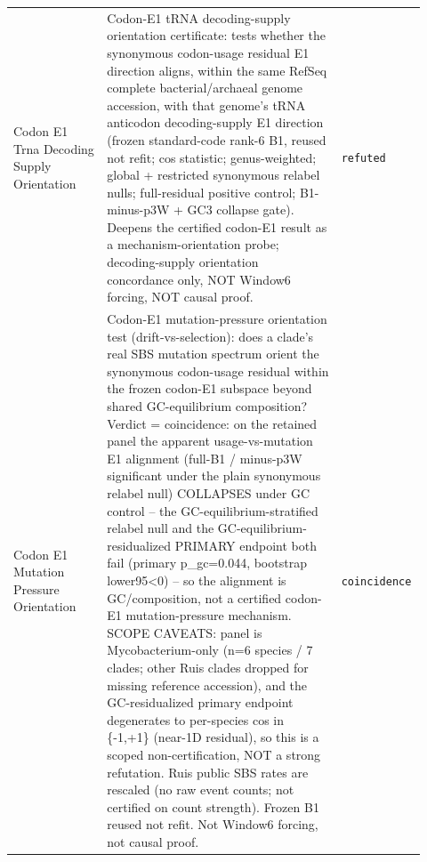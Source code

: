 \begin{longtable}{>{\raggedright\arraybackslash}p{0.22\linewidth}>{\raggedright\arraybackslash}p{0.55\linewidth}>{\raggedright\arraybackslash}p{0.15\linewidth}}
Codon E1 Trna Decoding Supply Orientation & Codon-E1 tRNA decoding-supply orientation certificate: tests whether the synonymous codon-usage residual E1 direction aligns, within the same RefSeq complete bacterial/archaeal genome accession, with that genome's tRNA anticodon decoding-supply E1 direction (frozen standard-code rank-6 B1, reused not refit; cos statistic; genus-weighted; global + restricted synonymous relabel nulls; full-residual positive control; B1-minus-p3W + GC3 collapse gate). Deepens the certified codon-E1 result as a mechanism-orientation probe; decoding-supply orientation concordance only, NOT Window6 forcing, NOT causal proof. & \texttt{refuted} \\
Codon E1 Mutation Pressure Orientation & Codon-E1 mutation-pressure orientation test (drift-vs-selection): does a clade's real SBS mutation spectrum orient the synonymous codon-usage residual within the frozen codon-E1 subspace beyond shared GC-equilibrium composition? Verdict = coincidence: on the retained panel the apparent usage-vs-mutation E1 alignment (full-B1 / minus-p3W significant under the plain synonymous relabel null) COLLAPSES under GC control -- the GC-equilibrium-stratified relabel null and the GC-equilibrium-residualized PRIMARY endpoint both fail (primary p\_gc=0.044, bootstrap lower95<0) -- so the alignment is GC/composition, not a certified codon-E1 mutation-pressure mechanism. SCOPE CAVEATS: panel is Mycobacterium-only (n=6 species / 7 clades; other Ruis clades dropped for missing reference accession), and the GC-residualized primary endpoint degenerates to per-species cos in \{-1,+1\} (near-1D residual), so this is a scoped non-certification, NOT a strong refutation. Ruis public SBS rates are rescaled (no raw event counts; not certified on count strength). Frozen B1 reused not refit. Not Window6 forcing, not causal proof. & \texttt{coincidence} \\

\end{longtable}
